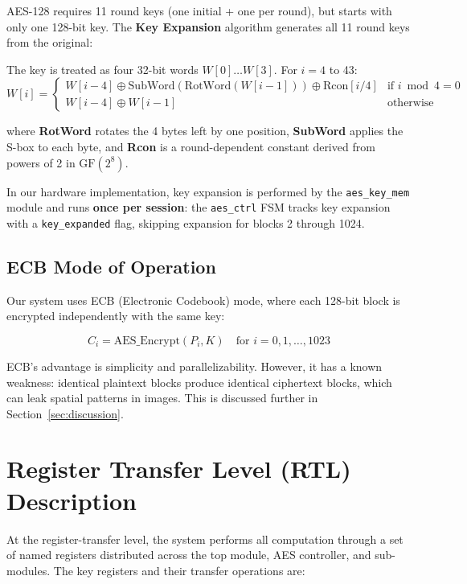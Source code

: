 \documentclass[12pt,a4paper]{article}
\begin{document}
AES-128 requires 11 round keys (one initial + one per round), but starts with only one 128-bit key. The \textbf{Key Expansion} algorithm generates all 11 round keys from the original:

The key is treated as four 32-bit words $W[0] \ldots W[3]$. For $i = 4$ to 43:
\[
W[i] = \begin{cases}
W[i-4] \oplus \text{SubWord}(\text{RotWord}(W[i-1])) \oplus \text{Rcon}[i/4] & \text{if } i \bmod 4 = 0 \\
W[i-4] \oplus W[i-1] & \text{otherwise}
\end{cases}
\]

where \textbf{RotWord} rotates the 4 bytes left by one position, \textbf{SubWord} applies the S-box to each byte, and \textbf{Rcon} is a round-dependent constant derived from powers of 2 in $\text{GF}(2^8)$.

In our hardware implementation, key expansion is performed by the \texttt{aes\_key\_mem} module and runs \textbf{once per session}: the \texttt{aes\_ctrl} FSM tracks key expansion with a \texttt{key\_expanded} flag, skipping expansion for blocks 2 through 1024.

\subsection{ECB Mode of Operation}

Our system uses ECB (Electronic Codebook) mode, where each 128-bit block is encrypted independently with the same key:

\[
C_i = \text{AES\_Encrypt}(P_i, K) \quad \text{for } i = 0, 1, \ldots, 1023
\]

ECB's advantage is simplicity and parallelizability. However, it has a known weakness: identical plaintext blocks produce identical ciphertext blocks, which can leak spatial patterns in images. This is discussed further in Section~\ref{sec:discussion}.


\section{Register Transfer Level (RTL) Description}

At the register-transfer level, the system performs all computation through a set of named registers distributed across the top module, AES controller, and sub-modules. The key registers and their transfer operations are:
\end{document}
